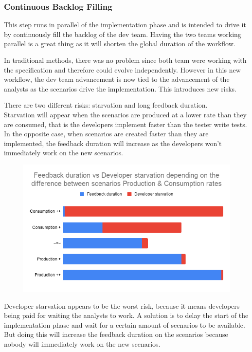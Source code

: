 \subsubsection{Continuous Backlog Filling}
This step runs in parallel of the implementation phase and is intended to
drive it by continuously fill the backlog of the dev team.
Having the two teams working parallel is a great thing as it will shorten the
global duration of the workflow.

In traditional methods, there was no problem since both team were working
with the specification and therefore could evolve independently.
However in this new workflow, the dev team advancement is now tied to the
advancement of the analysts as the scenarios drive the implementation.
This introduces new risks.

There are two different risks: starvation and long feedback duration. \\
Starvation will appear when the scenarios are produced at a lower rate than
they are consumed, that is the developers implement faster than the tester
write tests. \\
In the opposite case, when scenarios are created faster than they are
implemented, the feedback duration will increase as the developers won't
immediately work on the new scenarios.

\begin{figure}
    \includegraphics[width=\textwidth]{../../resources/images/solution/feedback_vs_starvation.png}
    \centering
\end{figure}

Developer starvation appears to be the worst risk, because it means
developers being paid for waiting the analysts to work.
A solution is to delay the start of the implementation phase and wait for a
certain amount of scenarios to be available.
But doing this will increase the feedback duration on the scenarios because
nobody will immediately work on the new scenarios.


